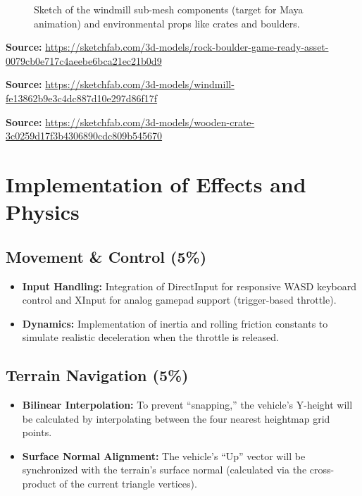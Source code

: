 \documentclass[11pt,a4paper]{article}
\begin{document}
\begin{figure}[htbp]
  \centering
  \caption{Sketch of the windmill sub-mesh components (target for Maya animation) and environmental props like crates and boulders.}
\end{figure}

\noindent\textbf{Source:} \url{https://sketchfab.com/3d-models/rock-boulder-game-ready-asset-0079cb0e717c4aeebe6bca21ec21b0d9}

\noindent\textbf{Source:} \url{https://sketchfab.com/3d-models/windmill-fe13862b9e3c4dc887d10e297d86f17f}

\noindent\textbf{Source:} \url{https://sketchfab.com/3d-models/wooden-crate-3c0259d17f3b4306890cdc809b545670}

\section{Implementation of Effects and Physics}

\subsection{Movement \& Control (5\%)}

\begin{itemize}
  \item \textbf{Input Handling:} Integration of DirectInput for responsive WASD keyboard control and XInput for analog gamepad support (trigger-based throttle).
  \item \textbf{Dynamics:} Implementation of inertia and rolling friction constants to simulate realistic deceleration when the throttle is released.
\end{itemize}

\subsection{Terrain Navigation (5\%)}

\begin{itemize}
  \item \textbf{Bilinear Interpolation:} To prevent ``snapping,'' the vehicle's Y-height will be calculated by interpolating between the four nearest heightmap grid points.
  \item \textbf{Surface Normal Alignment:} The vehicle's ``Up'' vector will be synchronized with the terrain's surface normal (calculated via the cross-product of the current triangle vertices).
\end{itemize}
\end{document}
